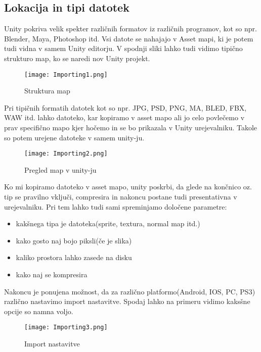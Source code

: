 {\color{indiagreen}\subsection{Lokacija in tipi datotek}}
Unity pokriva velik spekter različnih formatov iz različnih programov, kot so npr. Blender, Maya, Photoshop itd. Vsi datote se nahajajo v Asset mapi, ki je potem tudi vidna v samem Unity editorju. V spodnji sliki lahko tudi vidimo tipično strukturo map, ko se naredi nov Unity projekt.\\
\begin{figure}[ht!]
	\centering
	\texttt{[image: Importing1.png]}
	\caption{Struktura map}
\end{figure}
Pri tipičnih formatih datotek kot so npr. JPG, PSD, PNG, MA, BLED, FBX, WAW itd. lahko datoteko, kar kopiramo v asset mapo ali jo celo povlečemo v prav specifično mapo kjer hočemo in se bo prikazala v Unity urejevalniku. Takole so potem urejene datoteke v samem unity-ju.\\
\begin{figure}[ht!]
	\centering
	\texttt{[image: Importing2.png]}
	\caption{Pregled map v unity-ju}
\end{figure}
Ko mi kopiramo datoteko v asset mapo, unity poskrbi, da glede na končnico oz. tip se pravilno vključi, compresira in nakoncu postane tudi presentativna v urejevalniku. Pri tem lahko tudi sami spreminjamo določene parametre:
\begin{itemize}
	\item kakšnega tipa je datoteka(sprite, textura, normal map itd.)
	\item kako gosto naj bojo piksli(če je slika)
	\item kaliko prostora lahko zasede na disku
	\item kako naj se kompresira
\end{itemize}
Nakoncu je ponujena možnost, da za različno platformo(Android, IOS, PC, PS3) različno nastavimo import nastavitve. Spodaj lahko na primeru vidimo kaksšne opcije so namna voljo.
\begin{figure}[ht!]
	\centering
	\texttt{[image: Importing3.png]}
	\caption{Import nastavitve}
\end{figure}